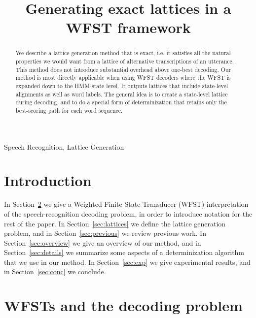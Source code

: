 \documentclass{article}
\title{Generating exact lattices in a WFST framework}
\begin{document}
\ninept  
%
\maketitle
%
\pagestyle{plain} %

\begin{abstract}
We describe a lattice generation method that is exact, i.e. it satisfies all the 
natural properties we would want from a lattice of alternative transcriptions of
an utterance.  This method does not introduce substantial overhead above one-best decoding.  Our method is
most directly applicable when using WFST decoders where the WFST is
expanded down to the HMM-state level.  It outputs
lattices that include state-level alignments as well as word labels.
The general idea is to create a state-level lattice during decoding, and to do
a special form of determinization that retains only the best-scoring path
for each word sequence.
\end{abstract}

\begin{keywords}
  Speech Recognition, Lattice Generation
\end{keywords}

\section{Introduction}

In Section~\ref{sec:wfst} we give a Weighted Finite State Transducer
(WFST) interpretation of the speech-recognition decoding problem, in order
to introduce notation for the rest of the paper.  In Section~\ref{sec:lattices}
we define the lattice generation problem, and in Section~\ref{sec:previous}
we review previous work.
In Section~\ref{sec:overview} we give an overview of our method,
and in Section~\ref{sec:details} we summarize some aspects of a determinization
algorithm that we use in our method.  In Section~\ref{sec:exp} we give
experimental results, and in Section~\ref{sec:conc} we conclude.

\section{WFSTs and the decoding problem}
\label{sec:wfst}
\end{document}
